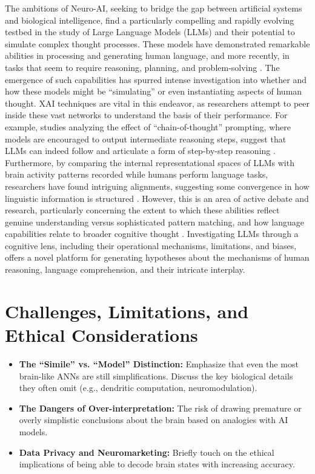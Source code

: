 The ambitions of Neuro-AI, seeking to bridge the gap between artificial systems and biological intelligence, find a particularly compelling and rapidly evolving testbed in the study of Large Language Models (LLMs) and their potential to simulate complex thought processes. These models have demonstrated remarkable abilities in processing and generating human language, and more recently, in tasks that seem to require reasoning, planning, and problem-solving \cite{wei2022chain}. The emergence of such capabilities has spurred intense investigation into whether and how these models might be ``simulating'' or even instantiating aspects of human thought. XAI techniques are vital in this endeavor, as researchers attempt to peer inside these vast networks to understand the basis of their performance. For example, studies analyzing the effect of ``chain-of-thought'' prompting, where models are encouraged to output intermediate reasoning steps, suggest that LLMs can indeed follow and articulate a form of step-by-step reasoning \cite{wei2022chain}. Furthermore, by comparing the internal representational spaces of LLMs with brain activity patterns recorded while humans perform language tasks, researchers have found intriguing alignments, suggesting some convergence in how linguistic information is structured \cite{caucheteux2022brains, toneva2019interpreting}. However, this is an area of active debate and research, particularly concerning the extent to which these abilities reflect genuine understanding versus sophisticated pattern matching, and how language capabilities relate to broader cognitive thought \cite{mahowald2023dissociating, binz2023using}. Investigating LLMs through a cognitive lens, including their operational mechanisms, limitations, and biases, offers a novel platform for generating hypotheses about the mechanisms of human reasoning, language comprehension, and their intricate interplay.

\section{Challenges, Limitations, and Ethical Considerations}
\begin{itemize}
    \item \textbf{The ``Simile'' vs. ``Model'' Distinction:} Emphasize that even the most brain-like ANNs are still simplifications. Discuss the key biological details they often omit (e.g., dendritic computation, neuromodulation).
    \item \textbf{The Dangers of Over-interpretation:} The risk of drawing premature or overly simplistic conclusions about the brain based on analogies with AI models.
    \item \textbf{Data Privacy and Neuromarketing:} Briefly touch on the ethical implications of being able to decode brain states with increasing accuracy.
\end{itemize}

